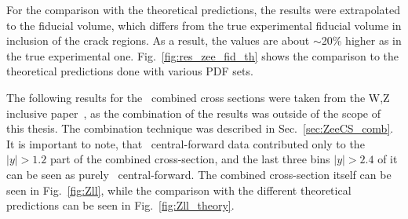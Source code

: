 For the comparison with the theoretical predictions, the results were extrapolated to the fiducial volume, which differs from the true experimental fiducial volume in inclusion of the crack regions. As a result, the values are about $\sim$20\% higher as in the true experimental one. Fig.~\ref{fig:res_zee_fid_th} shows the comparison to the theoretical predictions done with various PDF sets.

\begin{figure}
\end{figure}

The following results for the \Zll\ combined cross sections were taken from the W,Z inclusive paper~\cite{lib:wz2011}, as the combination of the results was outside of the scope of this thesis. The combination technique was described in Sec.~\ref{sec:ZeeCS_comb}. It is important to note, that \Zee\ central-forward data contributed only to the $|y| > 1.2$ part of the combined cross-section, and the last three bins $|y| > 2.4$ of it can be seen as purely \Zee\ central-forward. The combined cross-section itself can be seen in Fig.~\ref{fig:Zll}, while the comparison with the different theoretical predictions can be seen in Fig.~\ref{fig:Zll_theory}.

